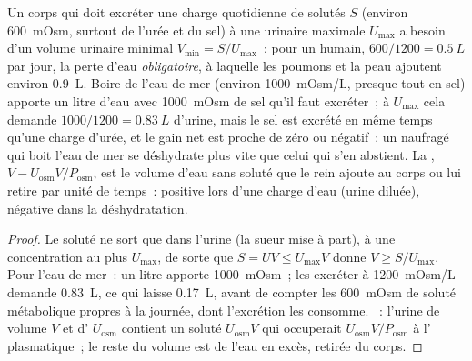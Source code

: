 \begin{proposition}\label{prop:b3:renal-osmoregulation:water}
Un corps qui doit excréter une charge quotidienne de solutés $S$
(environ \qty{600}{mOsm}, surtout de l'urée et du sel) à une 
urinaire maximale $U_{\max}$ a besoin d'un volume urinaire minimal
$V_{\min} = S/U_{\max}$~: pour un humain, $600/1200 = \qty{0.5}{L}$ par
jour, la perte d'eau \emph{obligatoire}, à laquelle les poumons et la
peau ajoutent environ \qty{0.9}{L}. Boire de l'eau de mer (environ
\qty{1000}{mOsm/L}, presque tout en sel) apporte un litre d'eau avec
\qty{1000}{mOsm} de sel qu'il faut excréter~; à $U_{\max}$ cela demande
$1000/1200 = \qty{0.83}{L}$ d'urine, mais le sel est excrété en même
temps qu'une charge d'urée, et le gain net est proche de zéro ou
négatif~: un naufragé qui boit l'eau de mer se déshydrate plus vite que
celui qui s'en abstient. La \emph{},
$V - U_{\text{osm}}V/P_{\text{osm}}$, est le volume d'eau sans soluté
que le rein ajoute au corps ou lui retire par unité de temps~: positive
lors d'une charge d'eau (urine diluée), négative dans la
déshydratation.
\end{proposition}
\begin{proof}
Le soluté ne sort que dans l'urine (la sueur mise à part), à une
concentration au plus $U_{\max}$, de sorte que $S = U V \le U_{\max}V$
donne $V \ge S/U_{\max}$. Pour l'eau de mer~: un litre apporte
\qty{1000}{mOsm}~; les excréter à \qty{1200}{mOsm/L} demande
\qty{0.83}{L}, ce qui laisse \qty{0.17}{L}, avant de compter les
\qty{600}{mOsm} de soluté métabolique propres à la journée, dont
l'excrétion les consomme. ~: l'urine de volume
$V$ et d' $U_{\text{osm}}$ contient un soluté
$U_{\text{osm}}V$ qui occuperait $U_{\text{osm}}V/P_{\text{osm}}$ à
l' plasmatique~; le reste du volume est de l'eau en excès,
retirée du corps.
\end{proof}

